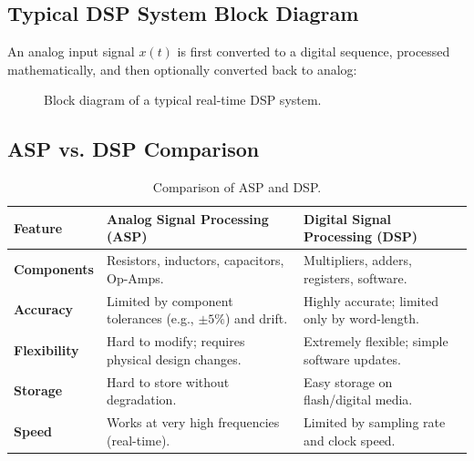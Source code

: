 \documentclass[11pt,a4paper]{article}
\begin{document}
\subsection{Typical DSP System Block Diagram}
An analog input signal $x(t)$ is first converted to a digital sequence, processed mathematically, and then optionally converted back to analog:

\begin{figure}[H]
\centering
{}
\caption{Block diagram of a typical real-time DSP system.}
\label{fig:dsp_block_diagram}
\end{figure}

\subsection{ASP vs. DSP Comparison}
\begin{table}[H]
\centering
\begin{tabular}{p{3.5cm} p{5.5cm} p{5.5cm}}
\toprule
\textbf{Feature} & \textbf{Analog Signal Processing (ASP)} & \textbf{Digital Signal Processing (DSP)} \\
\midrule
\textbf{Components} & Resistors, inductors, capacitors, Op-Amps. & Multipliers, adders, registers, software. \\
\textbf{Accuracy} & Limited by component tolerances (e.g., $\pm 5\%$) and drift. & Highly accurate; limited only by word-length. \\
\textbf{Flexibility} & Hard to modify; requires physical design changes. & Extremely flexible; simple software updates. \\
\textbf{Storage} & Hard to store without degradation. & Easy storage on flash/digital media. \\
\textbf{Speed} & Works at very high frequencies (real-time). & Limited by sampling rate and clock speed. \\
\bottomrule
\end{tabular}
\caption{Comparison of ASP and DSP.}
\label{tab:comparison}
\end{table}
\end{document}
